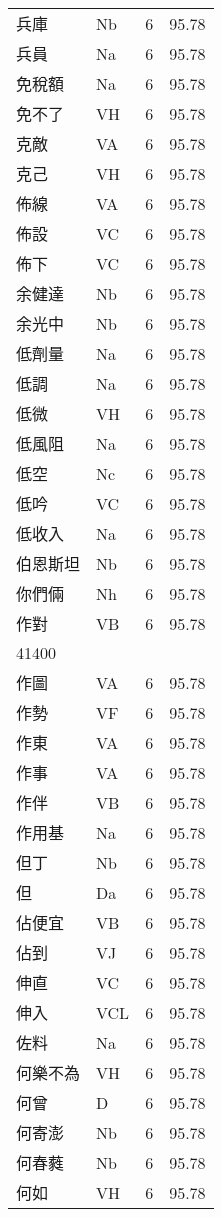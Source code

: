 \documentclass[twocolumn]{book}
\begin{document}
\begin{supertabular}{llrr}
兵庫 & Nb & 6 &  95.78\\
兵員 & Na & 6 &  95.78\\
免稅額 & Na & 6 &  95.78\\
免不了 & VH & 6 &  95.78\\
克敵 & VA & 6 &  95.78\\
克己 & VH & 6 &  95.78\\
佈線 & VA & 6 &  95.78\\
佈設 & VC & 6 &  95.78\\
佈下 & VC & 6 &  95.78\\
余健達 & Nb & 6 &  95.78\\
余光中 & Nb & 6 &  95.78\\
低劑量 & Na & 6 &  95.78\\
低調 & Na & 6 &  95.78\\
低微 & VH & 6 &  95.78\\
低風阻 & Na & 6 &  95.78\\
低空 & Nc & 6 &  95.78\\
低吟 & VC & 6 &  95.78\\
低收入 & Na & 6 &  95.78\\
伯恩斯坦 & Nb & 6 &  95.78\\
你們倆 & Nh & 6 &  95.78\\
作對 & VB & 6 &  95.78\\
41400\\
作圖 & VA & 6 &  95.78\\
作勢 & VF & 6 &  95.78\\
作東 & VA & 6 &  95.78\\
作事 & VA & 6 &  95.78\\
作伴 & VB & 6 &  95.78\\
作用基 & Na & 6 &  95.78\\
但丁 & Nb & 6 &  95.78\\
但 & Da & 6 &  95.78\\
佔便宜 & VB & 6 &  95.78\\
佔到 & VJ & 6 &  95.78\\
伸直 & VC & 6 &  95.78\\
伸入 & VCL & 6 &  95.78\\
佐料 & Na & 6 &  95.78\\
何樂不為 & VH & 6 &  95.78\\
何曾 & D & 6 &  95.78\\
何寄澎 & Nb & 6 &  95.78\\
何春蕤 & Nb & 6 &  95.78\\
何如 & VH & 6 &  95.78\\

\end{supertabular}
\end{document}
